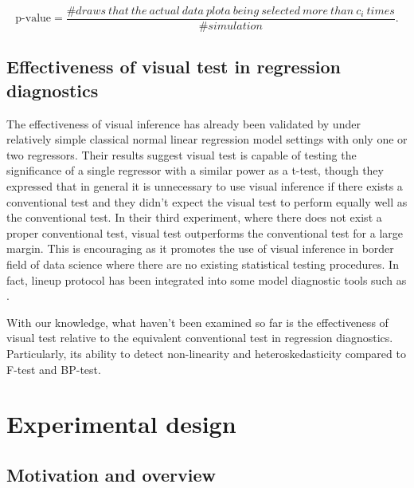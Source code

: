 \documentclass[]{interact}
\theoremstyle{plain}%
\theoremstyle{definition}
\theoremstyle{remark}
\begin{document}
\begin{equation} \label{eq:p-value-multi}
\text{p-value} = \frac{\#draws~that~the~actual~data~plota~being~selected~more~than~c_i~times}{\#simulation}.
\end{equation}

\hypertarget{effectiveness-of-visual-test-in-regression-diagnostics}{%
\subsection{Effectiveness of visual test in regression
diagnostics}\label{effectiveness-of-visual-test-in-regression-diagnostics}}

The effectiveness of visual inference has already been validated by
\citet{majumder_validation_2013} under relatively simple classical
normal linear regression model settings with only one or two regressors.
Their results suggest visual test is capable of testing the significance
of a single regressor with a similar power as a t-test, though they
expressed that in general it is unnecessary to use visual inference if
there exists a conventional test and they didn't expect the visual test
to perform equally well as the conventional test. In their third
experiment, where there does not exist a proper conventional test,
visual test outperforms the conventional test for a large margin. This
is encouraging as it promotes the use of visual inference in border
field of data science where there are no existing statistical testing
procedures. In fact, lineup protocol has been integrated into some model
diagnostic tools such as \citet{loy2013diagnostic}.

With our knowledge, what haven't been examined so far is the
effectiveness of visual test relative to the equivalent conventional
test in regression diagnostics. Particularly, its ability to detect
non-linearity and heteroskedasticity compared to F-test and BP-test.

\hypertarget{experimental-design}{%
\section{Experimental design}\label{experimental-design}}

\hypertarget{motivation-and-overview}{%
\subsection{Motivation and overview}\label{motivation-and-overview}}
\end{document}
